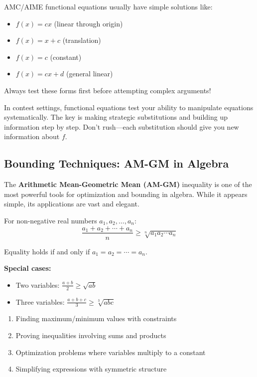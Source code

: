 \documentclass[12pt]{extarticle}
\begin{document}
\begin{warningbox}
AMC/AIME functional equations usually have simple solutions like:
\begin{itemize}
    \item $f(x) = cx$ (linear through origin)
    \item $f(x) = x + c$ (translation)
    \item $f(x) = c$ (constant)
    \item $f(x) = cx + d$ (general linear)
\end{itemize}
Always test these forms first before attempting complex arguments!
\end{warningbox}

\begin{remarkbox}
In contest settings, functional equations test your ability to manipulate equations systematically. The key is making strategic substitutions and building up information step by step. Don't rush—each substitution should give you new information about $f$.
\end{remarkbox}

\subsection{Bounding Techniques: AM-GM in Algebra}

The \textbf{Arithmetic Mean-Geometric Mean (AM-GM)} inequality is one of the most powerful tools for optimization and bounding in algebra. While it appears simple, its applications are vast and elegant.

\begin{conceptbox}[AM-GM Inequality]
For non-negative real numbers $a_1, a_2, \ldots, a_n$:
\[
\frac{a_1 + a_2 + \cdots + a_n}{n} \ge \sqrt[n]{a_1 a_2 \cdots a_n}
\]

Equality holds if and only if $a_1 = a_2 = \cdots = a_n$.

\textbf{Special cases:}
\begin{itemize}
    \item Two variables: $\frac{a+b}{2} \ge \sqrt{ab}$
    \item Three variables: $\frac{a+b+c}{3} \ge \sqrt[3]{abc}$
\end{itemize}
\end{conceptbox}

\begin{conceptbox}
\begin{enumerate}
    \item Finding maximum/minimum values with constraints
    \item Proving inequalities involving sums and products
    \item Optimization problems where variables multiply to a constant
    \item Simplifying expressions with symmetric structure
\end{enumerate}
\end{conceptbox}
\end{document}
